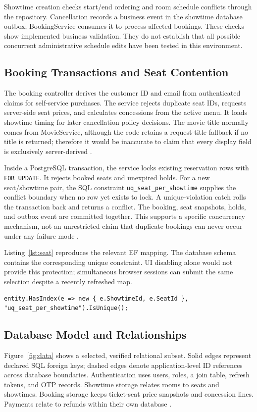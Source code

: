 \documentclass[conference]{IEEEtran}
\newcommand{\code}[1]{\texttt{#1}}
\begin{document}
Showtime creation checks start/end ordering and room schedule conflicts through
the repository. Cancellation records a business event in the showtime database
outbox; BookingService consumes it to process affected bookings. These checks
show implemented business validation. They do not establish that all possible
concurrent administrative schedule edits have been tested in this environment.

\subsection{Booking Transactions and Seat Contention}
The booking controller derives the customer ID and email from authenticated
claims for self-service purchases. The service rejects duplicate seat IDs,
requests server-side seat prices, and calculates concessions from the active
menu. It loads showtime timing for later cancellation policy decisions. The
movie title normally comes from MovieService, although the code retains a
request-title fallback if no title is returned; therefore it would be inaccurate
to claim that every display field is exclusively server-derived \cite{booking}.

Inside a PostgreSQL transaction, the service locks existing reservation rows
with \code{FOR UPDATE}. It rejects booked seats and unexpired holds. For a new
seat/showtime pair, the SQL constraint \code{uq\_seat\_per\_showtime} supplies
the conflict boundary when no row yet exists to lock. A unique-violation catch
rolls the transaction back and returns a conflict. The booking, seat snapshots,
holds, and outbox event are committed together. This supports a specific
concurrency mechanism, not an unrestricted claim that duplicate bookings can
never occur under any failure mode \cite{booking,db,postgres}.

Listing~\ref{lst:seat} reproduces the relevant EF mapping. The database schema
contains the corresponding unique constraint. UI disabling alone would not
provide this protection; simultaneous browser sessions can submit the same
selection despite a recently refreshed map.
\begin{lstlisting}[caption={Reservation uniqueness mapping from BookingDbContext.},label={lst:seat}]
entity.HasIndex(e => new { e.ShowtimeId, e.SeatId }, "uq_seat_per_showtime").IsUnique();
\end{lstlisting}

\subsection{Database Model and Relationships}
Figure~\ref{fig:data} shows a selected, verified relational subset. Solid edges
represent declared SQL foreign keys; dashed edges denote application-level ID
references across database boundaries. Authentication uses users, roles, a join
table, refresh tokens, and OTP records. Showtime storage relates rooms to seats
and showtimes. Booking storage keeps ticket-seat price snapshots and
concession lines. Payments relate to refunds within their own database
\cite{db,booking}.

\end{document}
